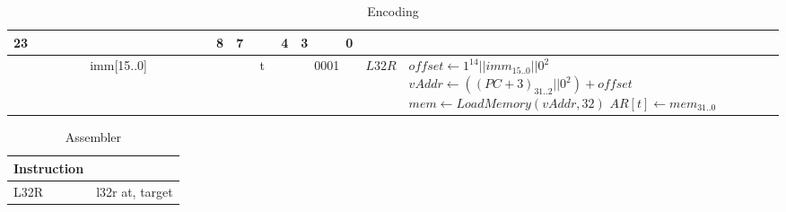 	\begin{longtable}{llllllllllllllllllllllll  p{1cm}  p{7cm} | }
		\caption{Encoding\label{long}}\\
		23 & & & & & & & & & & & & & & & 8 & 7 & & & 4 & 3 & & & 0 & &
		\multicolumn{1}{c}{}\\
		\hline
		\multicolumn{16}{|c|}{imm[15..0]} & \multicolumn{4}{c|}{t} & \multicolumn{4}{c|}{0001} & \multicolumn{1}{c|}{$L32R$} & $offset \leftarrow 1^{14}||imm_{15..0}||0^2$ \newline $vAddr \leftarrow ((PC + 3)_{31..2}||0^2) + offset$ \newline $mem \leftarrow LoadMemory(vAddr, 32)$ \newline $AR[t] \leftarrow mem_{31..0}$\\ \hline
	\end{longtable}

	\begin{longtable}{|p{5cm}|p{5cm}|}
		\caption{Assembler\label{long}}\\
		\hline
		Instruction & \\
		\hline
		L32R & l32r at, target\\ \hline
	\end{longtable}
